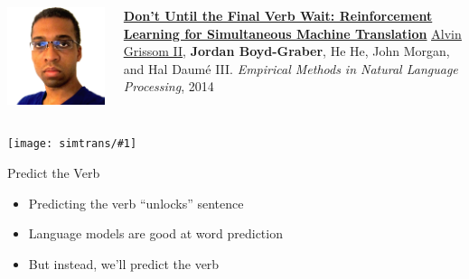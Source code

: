 \documentclass[compress]{beamer}
\newcommand{\gfxs}[2]{
\begin{center}
	\texttt{[image: simtrans/\#1]}
\end{center}
}
\begin{document}
\begin{frame}{}

  \begin{columns}
        \includegraphics[width=0.9\linewidth]{general_figures/alvin}
        \begin{block}{ {\bf \href{http://cs.colorado.edu/~jbg//docs/2014_emnlp_simtrans.pdf}{Don't Until the Final Verb Wait: Reinforcement Learning for Simultaneous Machine Translation}}}
\underline{\href{http://www.umiacs.umd.edu/~alvin/}{Alvin Grissom II}}, {\bf Jordan Boyd-Graber}, He He, John Morgan, and Hal {Daum\'{e} III}.  \emph{Empirical Methods in Natural Language Processing}, 2014
        \end{block}
  \end{columns}
\end{frame}

\begin{frame}[plain]
\vspace{-4cm}
\gfxs{autocomplete}{1.0}
\pause
\vspace{-6cm}
\begin{block}{Predict the Verb}
  \begin{itemize}
    \item Predicting the verb ``unlocks'' sentence
    \item Language models are good at word prediction
    \item But instead, we'll predict the verb
  \end{itemize}
\end{block}

\end{frame}
\end{document}
